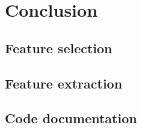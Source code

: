 \documentclass[
  oneside,
  11pt, a4paper,
  footinclude=true,
  headinclude=true,
  cleardoublepage=empty
]{scrbook}
\begin{document}
\part{Conclusion}


%
		
\cleardoublepage



\printglossary[type=\acronymtype]

\appendix
\renewcommand\chaptername{Appendix}

\chapter{Feature selection}
\label{apdx:sec:feature_selection}


\chapter{Feature extraction}
\label{apdx:sec:feature_extraction}


\chapter{Code documentation}
\label{apdx:sec:code_documentation}


\begin{backcover}
\thispagestyle{empty} \pagecolor{white} \textcolor{black} {\selectfont ~\vfill
\noindent
%
\vfill ~}
\end{backcover}
\end{document}

